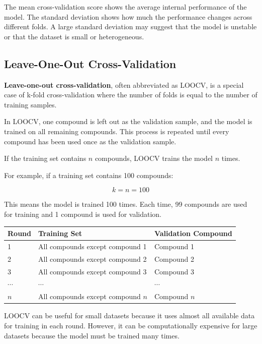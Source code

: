 \documentclass[11pt]{report}
\newenvironment{Important note}{\begin{quote}\color{red}\textbf{Important note:} }{\end{quote}}
\begin{document}
The mean cross-validation score shows the average internal performance of the model. The standard deviation shows how much the performance changes across different folds. A large standard deviation may suggest that the model is unstable or that the dataset is small or heterogeneous.

\subsection{Leave-One-Out Cross-Validation}

\textbf{Leave-one-out cross-validation}, often abbreviated as LOOCV, is a special case of k-fold cross-validation where the number of folds is equal to the number of training samples.

In LOOCV, one compound is left out as the validation sample, and the model is trained on all remaining compounds. This process is repeated until every compound has been used once as the validation sample.

If the training set contains $n$ compounds, LOOCV trains the model $n$ times.

For example, if a training set contains 100 compounds:

\[
k = n = 100
\]

This means the model is trained 100 times. Each time, 99 compounds are used for training and 1 compound is used for validation.

\begin{center}
\begin{tabular}{lll}
\toprule
\textbf{Round} & \textbf{Training Set} & \textbf{Validation Compound} \\
\midrule
1 & All compounds except compound 1 & Compound 1 \\
2 & All compounds except compound 2 & Compound 2 \\
3 & All compounds except compound 3 & Compound 3 \\
$\cdots$ & $\cdots$ & $\cdots$ \\
$n$ & All compounds except compound $n$ & Compound $n$ \\
\bottomrule
\end{tabular}
\end{center}

LOOCV can be useful for small datasets because it uses almost all available data for training in each round. However, it can be computationally expensive for large datasets because the model must be trained many times.
\end{document}
